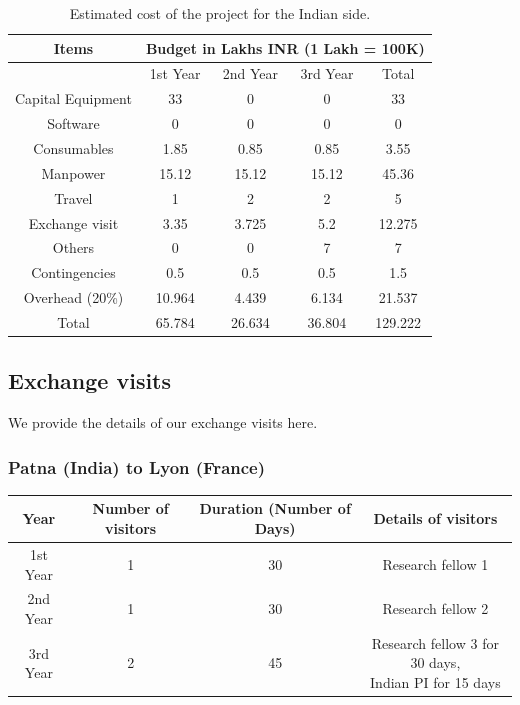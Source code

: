 \documentclass[a4paper,11pt]{article}
\begin{document}
\begin{table}[htb]
	\begin{center}
	\begin{tabular}{|c|c|c|c|c|}
		\hline
		Items              & \multicolumn{4}{l}{Budget in Lakhs INR (1 Lakh = 100K)}      \\ \hline
  		& 1st Year & 2nd Year & 3rd Year & Total\\ \hline
		Capital Equipment & 33     & 0      & 0      & 33      \\ \hline
		Software          & 0      & 0      & 0      & 0       \\ \hline
		Consumables       & 1.85   & 0.85   & 0.85   & 3.55    \\ \hline
		Manpower          & 15.12  & 15.12  & 15.12  & 45.36   \\ \hline
		Travel            & 1      & 2      & 2      & 5       \\ \hline
		Exchange visit    & 3.35   & 3.725  & 5.2    & 12.275  \\ \hline
		Others            & 0      & 0      & 7      & 7       \\ \hline
		Contingencies     & 0.5    & 0.5    & 0.5    & 1.5     \\ \hline
		Overhead (20\%)   & 10.964 & 4.439  & 6.134  & 21.537  \\ \hline
		Total             & 65.784 & 26.634 & 36.804 & 129.222\\ \hline
	\end{tabular}
		\caption{Estimated cost of the project for the Indian side.	\label{tab:costs:Indian}}
	\end{center}
\end{table}

\subsection{Exchange visits}
We provide the details of our exchange visits here.
\subsubsection*{Patna (India) to Lyon (France)}

\begin{center}
\begin{tabular}{|c|c|c|c|}
	\hline
	\textbf{Year} & \textbf{Number of visitors} & \textbf{Duration (Number of Days)} & \textbf{Details of visitors}\\ \hline
	1st Year & 1 & 30 & Research fellow 1\\ \hline
	2nd Year & 1 & 30 & Research fellow 2\\ \hline
	3rd Year & 2 & 45 & \makecell{Research fellow 3 for 30 days,\\ Indian PI for 15 days}\\ \hline
\end{tabular}
\end{center}
\end{document}
